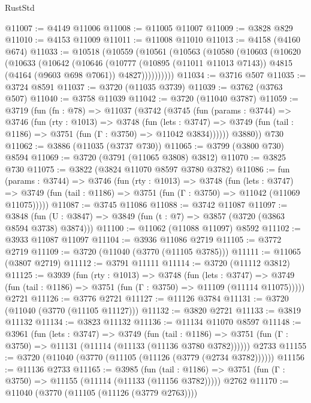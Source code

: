 \begin{lexlean}{RustStd}
\begin{coremodule}
@11007 := @4149 @11006
@11008 := @11005 @11007
@11009 := @3828 @829
@11010 := @4153 @11009
@11011 := @11008 @11010
@11013 := @4158 (@4160 @674)
@11033 := @10518
    (@10559
      (@10561
        (@10563
          (@10580
            (@10603
              (@10620
                (@10633
                  (@10642
                    (@10646
                      (@10777
                        (@10895 (@11011 @11013 @7143))
                        @4815
                        (@4164 (@9603 @698 @7061))
                        @4827))))))))))
@11034 := @3716 @507
@11035 := @3724 @8591
@11037 := @3720 (@11035 @3739)
@11039 := @3762 (@3763 @507)
@11040 := @3758 @11039
@11042 := @3720 (@11040 @3787)
@11059 := @3719
    (fun (fn : @78) =>
    @11037
      (@3742
        (@3745
          (fun (params : @3744) =>
          @3746
            (fun (rty : @1013) =>
            @3748
              (fun (lets : @3747) =>
              @3749 (fun (tail : @1186) => @3751 (fun (Γ : @3750) => @11042 @3834))))))
        @3880))
    @730
@11062 := @3886 (@11035 (@3737 @730))
@11065 := @3799 (@3800 @730) @8594
@11069 := @3720 (@3791 (@11065 @3808) @3812)
@11070 := @3825 @730
@11075 := @3822 (@3824 @11070 @8597 @3780 @3782)
@11086 := fun (params : @3744) =>
  @3746
    (fun (rty : @1013) =>
    @3748
      (fun (lets : @3747) =>
      @3749 (fun (tail : @1186) => @3751 (fun (Γ : @3750) => @11042 (@11069 @11075)))))
@11087 := @3745 @11086
@11088 := @3742 @11087
@11097 := @3848 (fun (U : @3847) => @3849 (fun (t : @7) => @3857 (@3720 (@3863 @8594 @3738) @3874)))
@11100 := @11062 (@11088 @11097) @8592
@11102 := @3933 @11087 @11097
@11104 := @3936 @11086 @2719
@11105 := @3772 @2719
@11109 := @3720 (@11040 (@3770 (@11105 @3785)))
@11111 := @11065 (@3807 @2719)
@11112 := @3791 @11111
@11114 := @3720 (@11112 @3812)
@11125 := @3939
    (fun (rty : @1013) =>
    @3748
      (fun (lets : @3747) =>
      @3749 (fun (tail : @1186) => @3751 (fun (Γ : @3750) => @11109 (@11114 @11075)))))
    @2721
@11126 := @3776 @2721
@11127 := @11126 @3784
@11131 := @3720 (@11040 (@3770 (@11105 @11127)))
@11132 := @3820 @2721
@11133 := @3819 @11132
@11134 := @3823 @11132
@11136 := @11134 @11070 @8597
@11148 := @3961
    (fun (lets : @3747) =>
    @3749
      (fun (tail : @1186) =>
      @3751 (fun (Γ : @3750) => @11131 (@11114 (@11133 (@11136 @3780 @3782))))))
    @2733
@11155 := @3720 (@11040 (@3770 (@11105 (@11126 (@3779 (@2734 @3782))))))
@11156 := @11136 @2733
@11165 := @3985
    (fun (tail : @1186) => @3751 (fun (Γ : @3750) => @11155 (@11114 (@11133 (@11156 @3782)))))
    @2762
@11170 := @11040 (@3770 (@11105 (@11126 (@3779 @2763))))

\end{coremodule}
\end{lexlean}
